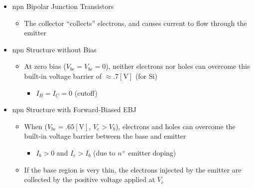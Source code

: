 \begin{itemize}

  \item npn Bipolar Junction Transistors

    \begin{itemize}

      \item The collector ``collects'' electrons, and causes current to flow through the emitter

    \end{itemize}
    
  \item npn Structure without Bias

    \begin{itemize}

      \item At zero bias ($V_{be}=V_{bc}=0$), neither electrons nor holes can overcome this built-in voltage barrier of $\approx.7[\si{\volt}]$ (for Si)

        \begin{itemize}

          \item $I_B=I_C=0$ (cutoff)

        \end{itemize}

    \end{itemize}

  \item npn Structure with Forward-Biased EBJ

    \begin{itemize}

      \item When ($V_{be}=.65[\si{\volt}]$, $V_c>V_b$), electrons and holes can overcome the built-in voltage barrier between the base and emitter

        \begin{itemize}

          \item $I_b>0$ and $I_e>I_b$ (due to $n^+$ emitter doping)

        \end{itemize}

      \item If the base region is very thin, the electrons injected by the emitter are collected by the positive voltage applied at $V_c$

        \begin{itemize}


\end{itemize}
\end{itemize}
\end{itemize}
